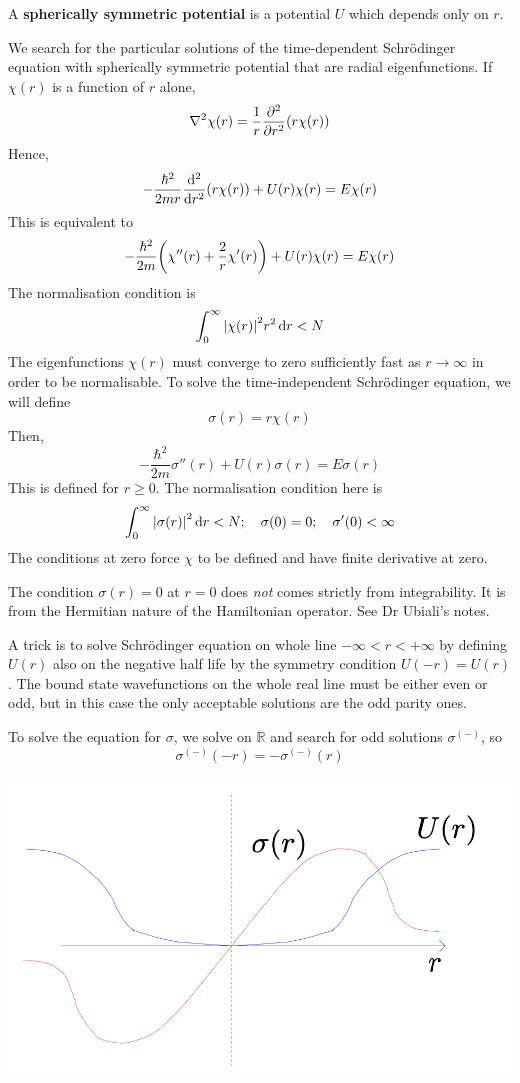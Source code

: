 \documentclass[a4paper,11pt]{article}
\begin{document}
\begin{definition}
	A \textbf{spherically symmetric potential} is a potential \( U \) which depends only on \( r \).
\end{definition}
We search for the particular solutions of the time-dependent Schr\"odinger equation with spherically symmetric potential that are radial eigenfunctions.
If \( \chi(r) \) is a function of \( r \) alone,
\[
	\laplacian{\chi(r)} = \frac{1}{r} \pdv[2]{r} \qty(r\chi(r))
\]
Hence,
\[
	-\frac{\hbar^2}{2mr} \dv[2]{r} \qty(r \chi(r)) + U(r) \chi(r) = E \chi(r)
\]
This is equivalent to
\[
	-\frac{\hbar^2}{2m} \qty( \chi''(r) + \frac{2}{r} \chi'(r) ) + U(r) \chi(r) = E \chi(r)
\]
The normalisation condition is
\[
	\int_0^\infty \abs{\chi(r)}^2 r^2 \dd{r} < N
\]
The eigenfunctions \( \chi(r) \) must converge to zero sufficiently fast as \( r \to \infty \) in order to be normalisable.
To solve the time-independent Schr\"odinger equation, we will define
\[
	\sigma(r) = r \chi(r)
\]
Then,
\[
	-\frac{\hbar^2}{2m} \sigma''(r) + U(r) \sigma(r) = E \sigma(r)
\]
This is defined for \( r \geq 0 \).
The normalisation condition here is
\[
	\int_0^\infty \abs{\sigma(r)}^2 \dd{r} < N;\quad \sigma(0) = 0;\quad \sigma'(0) < \infty
\]
The conditions at zero force \( \chi \) to be defined and have finite derivative at zero. 

\begin{note}
	The condition $\sigma(r)=0$ at $r=0$ does \textit{not} comes strictly from integrability. It is from the Hermitian nature of the Hamiltonian operator. See Dr Ubiali's notes.
\end{note}

A trick is to solve Schr\"odinger equation on whole line $-\infty<r<+\infty$ by defining $U(r)$ also on the negative half life by the symmetry condition $U(-r)=U(r)$. The bound state wavefunctions on the whole real line must be either even or odd, but in this case the only acceptable solutions are the odd parity ones. 

To solve the equation for \( \sigma \), we solve on \( \mathbb R \) and search for odd solutions \( \sigma^{(-)} \), so
\[
	\sigma^{(-)}(-r) = -\sigma^{(-)}(r)
\]

\begin{center}
	\includegraphics[scale=0.3]{qm11.png}
\end{center}
\end{document}
